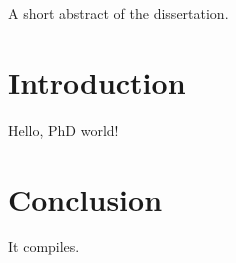 \documentclass[university=luiss, phd, language=english, twoside]{academicthesis}
\begin{document}
\frontpage

\frontmatter
\begin{abstractthesis}
  A short abstract of the dissertation.
\end{abstractthesis}

\tableofcontents

\mainmatter
\chapter{Introduction}
Hello, PhD world!

\chapter{Conclusion}
It compiles.
\end{document}
